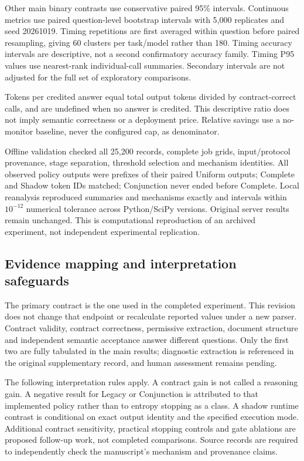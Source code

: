 \documentclass[12pt,a4paper]{article}
\begin{document}
Other main binary contrasts use conservative paired 95\% intervals. Continuous metrics use paired question-level bootstrap intervals with 5,000 replicates and seed 20261019. Timing repetitions are first averaged within question before paired resampling, giving 60 clusters per task/model rather than 180. Timing accuracy intervals are descriptive, not a second confirmatory accuracy family. Timing P95 values use nearest-rank individual-call summaries. Secondary intervals are not adjusted for the full set of exploratory comparisons.

Tokens per credited answer equal total output tokens divided by contract-correct calls, and are undefined when no answer is credited. This descriptive ratio does not imply semantic correctness or a deployment price. Relative savings use a no-monitor baseline, never the configured cap, as denominator.

Offline validation checked all 25,200 records, complete job grids, input/protocol provenance, stage separation, threshold selection and mechanism identities. All observed policy outputs were prefixes of their paired Uniform outputs; Complete and Shadow token IDs matched; Conjunction never ended before Complete. Local reanalysis reproduced summaries and mechanisms exactly and intervals within $10^{-12}$ numerical tolerance across Python/SciPy versions. Original server results remain unchanged. This is computational reproduction of an archived experiment, not independent experimental replication.

\subsection{Evidence mapping and interpretation safeguards}
The primary contract is the one used in the completed experiment. This revision does not change that endpoint or recalculate reported values under a new parser. Contract validity, contract correctness, permissive extraction, document structure and independent semantic acceptance answer different questions. Only the first two are fully tabulated in the main results; diagnostic extraction is referenced in the original supplementary record, and human assessment remains pending.

The following interpretation rules apply. A contract gain is not called a reasoning gain. A negative result for Legacy or Conjunction is attributed to that implemented policy rather than to entropy stopping as a class. A shadow runtime contrast is conditional on exact output identity and the specified execution mode. Additional contract sensitivity, practical stopping controls and gate ablations are proposed follow-up work, not completed comparisons. Source records are required to independently check the manuscript's mechanism and provenance claims.
\end{document}

